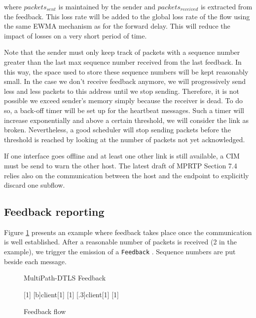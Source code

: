 where $packets_{sent}$ is maintained by the sender and $packets_{received}$ is extracted from the feedback. This loss rate will be added to the global loss rate of the flow using the same EWMA mechanism as for the forward delay. This will reduce the impact of losses on a very short period of time.

Note that the sender must only keep track of packets with a sequence number greater than the last max sequence number received from the last feedback. In this way, the space used to store these sequence numbers will be kept reasonably small. In the case we don't receive feedback anymore, we will progressively send less and less packets to this address until we stop sending. Therefore, it is not possible we exceed sender's memory simply because the receiver is dead. To do so, a back-off timer will be set up for the heartbeat messages. Such a timer will increase exponentially and above a certain threshold, we will consider the link as broken. Nevertheless, a good scheduler will stop sending packets before the threshold is reached by looking at the number of packets not yet acknowledged. 

If one interface goes offline and at least one other link is still available, a CIM must be send to warn the other host. The latest draft of MPRTP \cite{singh-avtcore-mprtp} Section 7.4 relies also on the communication between the host and the endpoint to explicitly discard one subflow.


\subsection{Feedback reporting}
\label{sec:feedbackReport}


Figure \ref{fig:feedback} presents an example where feedback takes place once the communication is well established. After a reasonable number of packets is received (2 in the example), we trigger the emission of a \texttt{Feedback} . Sequence numbers are put beside each message.


\begin{figure}[!ht]
\centering
\begin{msc}[r]{MultiPath-DTLS Feedback}

\setlength{\instfootheight}{0em}
\setlength{\instheadheight}{0em}
\setlength{\instdist}{0.5\linewidth}
\setlength{\levelheight}{3em}


[1]
\nextlevel
{}[b]{}{client}[1]
\nextlevel
{}[1]
\nextlevel
{}[.3]{client}[1]
\nextlevel
{}[1]
\nextlevel

\end{msc}
\caption{Feedback flow}
\label{fig:feedback}
\end{figure}

